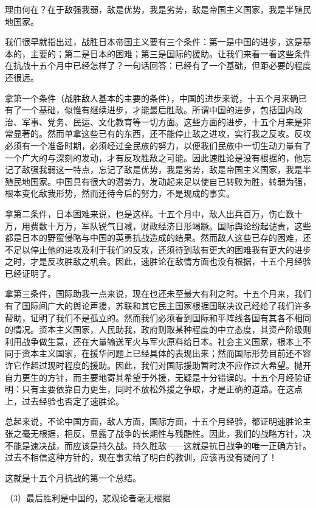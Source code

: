 \documentclass[UTF8, 12pt, a4paper]{ctexrep}
\begin{document}
理由何在？在于敌强我弱，敌是优势，我是劣势，敌是帝国主义国家，我是半殖民地国家。

我们很早就指出过，战胜日本帝国主义要有三个条件：第一是中国的进步，这是基本的，主要的；第二是日本的困难；第三是国际的援助。让我们来看一看这些条件在抗战十五个月中已经怎样了？一句话回答：已经有了一个基础，但距必要的程度还很远。

拿第一个条件（战胜敌人基本的主要的条件），中国的进步来说，十五个月来确已有了一个基础，似惟有继续进步，才能最后胜敌。所谓中国的进步，包括国内政治、军事、党务、民运、文化教育等一切方面。这些方面的进步，十五个月来是非常显著的。然而单拿这些已有的东西，还不能停止敌之进攻，实行我之反攻。反攻必须有一个准备时期，必须经过全民族的努力，以便我们民族中一切生动力量有了一个广大的与深刻的发动，才有反攻胜敌之可能。因此速胜论是没有根据的，他忘记了敌强我弱这一特点，忘记了敌是优势，我是劣势，敌是帝国主义国家，我是半殖民地国家。中国具有很大的潜势力，发动起来足以使自已转败为胜，转弱为强，根本变化敌我形势，然而还待今后的努力，不是现成的事实。

拿第二条件，日本困难来说，也是这样。十五个月中，敌人出兵百万，伤亡数十万，用费数十万万，军队锐气日减，财政经济日形竭蹶。国际舆论纷起谴责，这些都是日本的野蛮侵略与中国的英勇抗战造成的结果。然而敌人这些已存的困难，还不足以停止他的进攻及利于我们的反攻，还须待到敌有更大的困难我有更大的进步之时，才是反攻胜敌之机会。因此，速胜论在敌情方面也没有根据，十五个月经验已经证明了。

拿第三条件，国际助我一点来说，现在也还未至最大有利之时。十五个月来，我们有了国际间广大的舆论声援，苏联和其它民主国家根据国联决议己经给了我们许多帮助，证明了我们不是孤立的。然而我们必须看到国际和平阵线各国有其各不相同的情况。资本主义国家，人民助我，政府则取某种程度的中立态度，其资产阶级则利用战争做生意，还在大量输送军火与军火原料给日本。社会主义国家，根本上不同于资本主义国家，在援华问题上已经具体的表现出来；然而国际形势目前还不容许它作超过现时程度的援助。因此，我们对国际援助暂时决不应作过大希望。抛开自力更生的方针，而主要地寄其希望于外援，无疑是十分错误的。十五个月经验证明：只有主要依靠自力更生，同时不放松外援之争取，才是正确的道路。在这点上，过去经验也否定了速胜论。

总起来说，不论中国方面，敌人方面，国际方面，十五个月经验，都证明速胜论主张之毫无根据，相反，显露了战争的长期性与残酷性。因此，我们的战略方针，决不能是速决战，而应该是持久战。持久胜敌——这就是抗日战争的唯一正确方针。过去不相信这种方针的，现在事实给了明白的教训，应该再没有疑问了！

这就是十五个月抗战的第一个总结。

（3）最后胜利是中国的，悲观论者毫无根据
\end{document}
